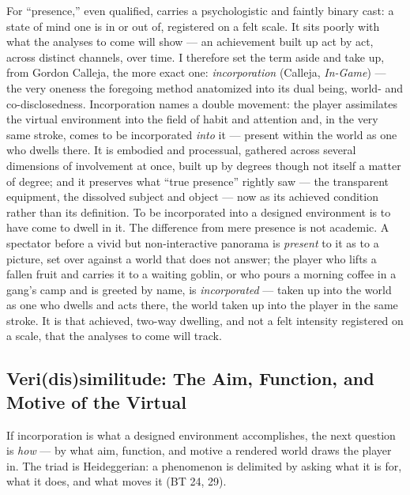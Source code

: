 \documentclass{article}
\begin{document}
For ``presence,'' even qualified, carries a psychologistic and faintly binary cast: a state of mind one is in or out of, registered on a felt scale. It sits poorly with what the analyses to come will show — an achievement built up act by act, across distinct channels, over time. I therefore set the term aside and take up, from Gordon Calleja, the more exact one: \textit{incorporation} (Calleja, \textit{In-Game}) — the very oneness the foregoing method anatomized into its dual being, world- and co-disclosedness. Incorporation names a double movement: the player assimilates the virtual environment into the field of habit and attention and, in the very same stroke, comes to be incorporated \textit{into} it — present within the world as one who dwells there. It is embodied and processual, gathered across several dimensions of involvement at once, built up by degrees though not itself a matter of degree; and it preserves what ``true presence'' rightly saw — the transparent equipment, the dissolved subject and object — now as its achieved condition rather than its definition. To be incorporated into a designed environment is to have come to dwell in it. The difference from mere presence is not academic. A spectator before a vivid but non-interactive panorama is \textit{present} to it as to a picture, set over against a world that does not answer; the player who lifts a fallen fruit and carries it to a waiting goblin, or who pours a morning coffee in a gang's camp and is greeted by name, is \textit{incorporated} — taken up into the world as one who dwells and acts there, the world taken up into the player in the same stroke. It is that achieved, two-way dwelling, and not a felt intensity registered on a scale, that the analyses to come will track.

\bigskip

\subsection*{Veri(dis)similitude: The Aim, Function, and Motive of the Virtual}

If incorporation is what a designed environment accomplishes, the next question is \textit{how} — by what aim, function, and motive a rendered world draws the player in. The triad is Heideggerian: a phenomenon is delimited by asking what it is for, what it does, and what moves it (BT 24, 29).
\end{document}
